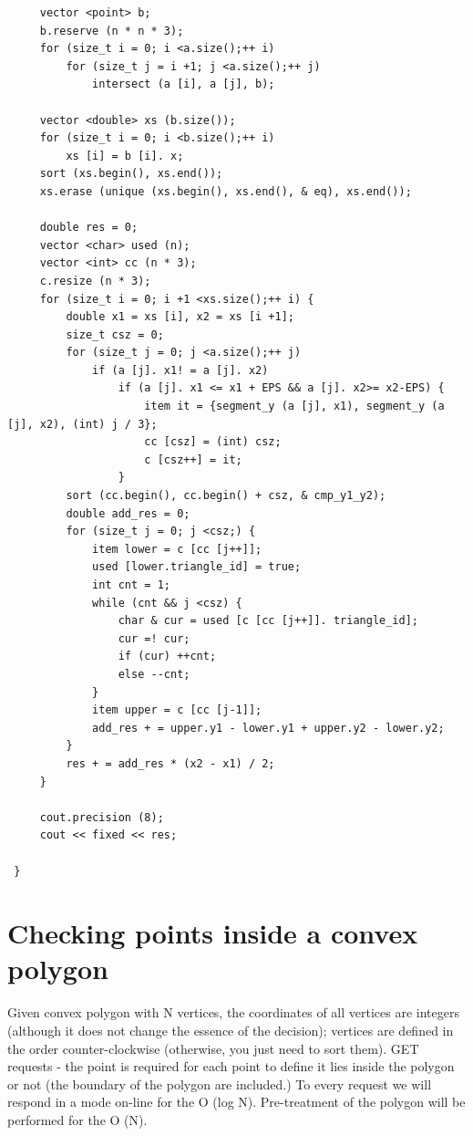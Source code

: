 \begin{verbatim}
     vector <point> b;
     b.reserve (n * n * 3);
     for (size_t i = 0; i <a.size();++ i)
         for (size_t j = i +1; j <a.size();++ j)
             intersect (a [i], a [j], b);

     vector <double> xs (b.size());
     for (size_t i = 0; i <b.size();++ i)
         xs [i] = b [i]. x;
     sort (xs.begin(), xs.end());
     xs.erase (unique (xs.begin(), xs.end(), & eq), xs.end());

     double res = 0;
     vector <char> used (n);
     vector <int> cc (n * 3);
     c.resize (n * 3);
     for (size_t i = 0; i +1 <xs.size();++ i) {
         double x1 = xs [i], x2 = xs [i +1];
         size_t csz = 0;
         for (size_t j = 0; j <a.size();++ j)
             if (a [j]. x1! = a [j]. x2)
                 if (a [j]. x1 <= x1 + EPS && a [j]. x2>= x2-EPS) {
                     item it = {segment_y (a [j], x1), segment_y (a [j], x2), (int) j / 3};
                     cc [csz] = (int) csz;
                     c [csz++] = it;
                 }
         sort (cc.begin(), cc.begin() + csz, & cmp_y1_y2);
         double add_res = 0;
         for (size_t j = 0; j <csz;) {
             item lower = c [cc [j++]];
             used [lower.triangle_id] = true;
             int cnt = 1;
             while (cnt && j <csz) {
                 char & cur = used [c [cc [j++]]. triangle_id];
                 cur =! cur;
                 if (cur) ++cnt;
                 else --cnt;
             }
             item upper = c [cc [j-1]];
             add_res + = upper.y1 - lower.y1 + upper.y2 - lower.y2;
         }
         res + = add_res * (x2 - x1) / 2;
     }

     cout.precision (8);
     cout << fixed << res;

 } 
\end{verbatim}
\section{ Checking points inside a convex polygon }
Given convex polygon with N vertices, the coordinates of all vertices are integers (although it does not change the essence of the decision); vertices are defined in the order counter-clockwise (otherwise, you just need to sort them). GET requests - the point is required for each point to define it lies inside the polygon or not (the boundary of the polygon are included.) To every request we will respond in a mode on-line for the O (log N). Pre-treatment of the polygon will be performed for the O (N).

